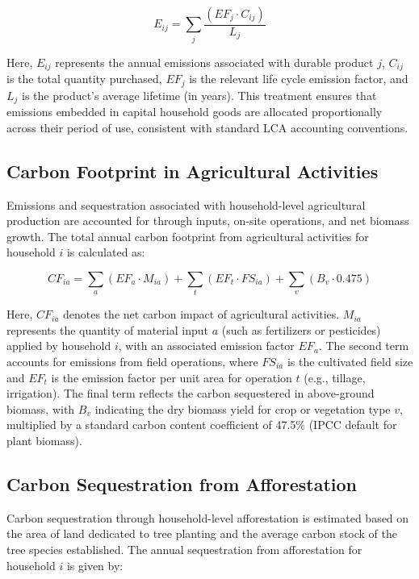 \documentclass[12pt,a4paper]{article}%
\begin{document}
\begin{equation}
E_{ij} = \sum_j \frac{(EF_j \cdot C_{ij})}{L_j}
\end{equation}

Here, $E_{ij}$ represents the annual emissions associated with durable product $j$, $C_{ij}$ is the total quantity purchased, $EF_j$ is the relevant life cycle emission factor, and $L_j$ is the product’s average lifetime (in years). This treatment ensures that emissions embedded in capital household goods are allocated proportionally across their period of use, consistent with standard LCA accounting conventions.


\subsection{Carbon Footprint in Agricultural Activities}

Emissions and sequestration associated with household-level agricultural production are accounted for through inputs, on-site operations, and net biomass growth. The total annual carbon footprint from agricultural activities for household $i$ is calculated as:

\begin{equation}
CF_{ia} = \sum_a (EF_a \cdot M_{ia}) + \sum_t (EF_t \cdot FS_{ia}) + \sum_v (B_v \cdot 0.475)
\end{equation}

Here, $CF_{ia}$ denotes the net carbon impact of agricultural activities. $M_{ia}$ represents the quantity of material input $a$ (such as fertilizers or pesticides) applied by household $i$, with an associated emission factor $EF_a$. The second term accounts for emissions from field operations, where $FS_{ia}$ is the cultivated field size and $EF_t$ is the emission factor per unit area for operation $t$ (e.g., tillage, irrigation). The final term reflects the carbon sequestered in above-ground biomass, with $B_v$ indicating the dry biomass yield for crop or vegetation type $v$, multiplied by a standard carbon content coefficient of 47.5\% (IPCC default for plant biomass).


\subsection{Carbon Sequestration from Afforestation}

Carbon sequestration through household-level afforestation is estimated based on the area of land dedicated to tree planting and the average carbon stock of the tree species established. The annual sequestration from afforestation for household $i$ is given by:
\end{document}
